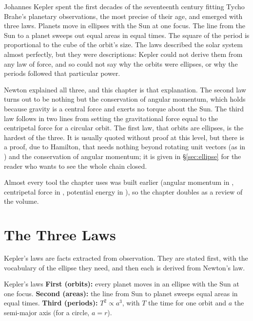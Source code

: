 \label{ch:kepler}


Johannes Kepler spent the first decades of the seventeenth century fitting Tycho Brahe's planetary
observations, the most precise of their age, and emerged with three laws. Planets move in ellipses with the
Sun at one focus. The line from the Sun to a planet sweeps out equal areas in equal times. The square of the
period is proportional to the cube of the orbit's size. The laws described the solar system almost
perfectly, but they were descriptions: Kepler could not derive them from any law of force, and so could
not say why the orbits were ellipses, or why the periods followed that particular power.

Newton explained all three, and this chapter is that explanation. The second law turns out to be nothing
but the conservation of angular momentum, which holds because gravity is a central force and exerts no
torque about the Sun. The third law follows in two lines from setting the gravitational force equal to the
centripetal force for a circular orbit. The first law, that orbits are ellipses, is the hardest of the
three. It is usually quoted without proof at this level, but there is a proof, due to Hamilton, that needs
nothing beyond rotating unit vectors (as in ) and the conservation of angular momentum;
it is given in \S\ref{sec:ellipse} for the reader who wants to see the whole chain closed.

Almost every tool the chapter uses was built earlier (angular momentum in ,
centripetal force in , potential energy in ), so the chapter
doubles as a review of the volume.

\section{The Three Laws}

Kepler's laws are facts extracted from observation. They are stated first, with the vocabulary of the
ellipse they need, and then each is derived from Newton's law.

\begin{keybox}{Kepler's laws}
\textbf{First (orbits):} every planet moves in an ellipse with the Sun at one focus.
\textbf{Second (areas):} the line from Sun to planet sweeps equal areas in equal times.
\textbf{Third (periods):} $T^2\propto a^3$, with $T$ the time for one orbit and $a$ the semi-major axis
(for a circle, $a=r$).
\end{keybox}

